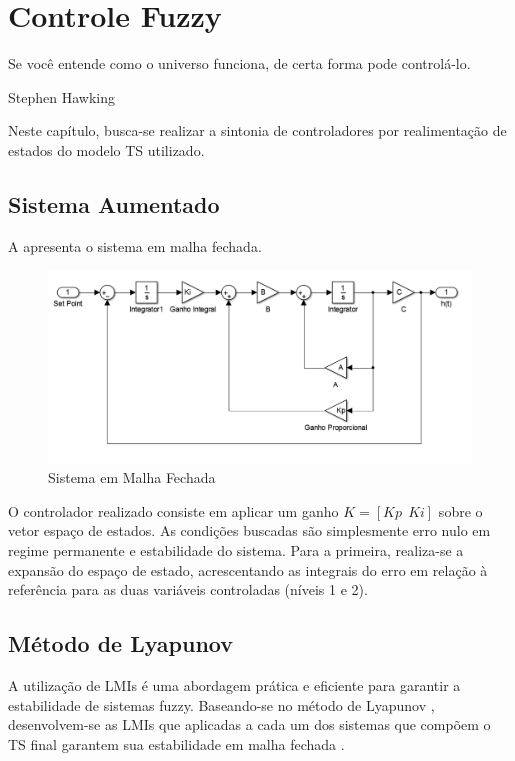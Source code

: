 %

\chapter{Controle Fuzzy} \label{capControle}
\epigraph{Se você entende como o universo funciona, de certa forma pode controlá-lo.}{Stephen Hawking}

Neste capítulo, busca-se realizar a sintonia de controladores por realimentação de estados do modelo TS utilizado.

\section{Sistema Aumentado}
 A  apresenta o sistema em malha fechada.

\begin{figure}[H]
	\begin{centering}
		\includegraphics[width=\textwidth]{img/modelo_controlado.png}
		\par\end{centering}
	\caption{\label{figModRealim}Sistema em Malha Fechada}
\end{figure}

O controlador realizado consiste em aplicar um ganho $K = [Kp \ \ Ki]$ sobre o vetor espaço de estados. As condições buscadas são simplesmente erro nulo em regime permanente e estabilidade do sistema. Para a primeira, realiza-se a expansão do espaço de estado, acrescentando as integrais do erro em relação à referência para as duas variáveis controladas (níveis 1 e 2).

\section{Método de Lyapunov}
A utilização de LMIs é uma abordagem prática e eficiente para garantir a estabilidade de sistemas fuzzy. Baseando-se no método de Lyapunov \cite{lyapunov}, desenvolvem-se as LMIs que aplicadas a cada um dos sistemas que compõem o TS final garantem sua estabilidade em malha fechada \cite{mozelli}.

